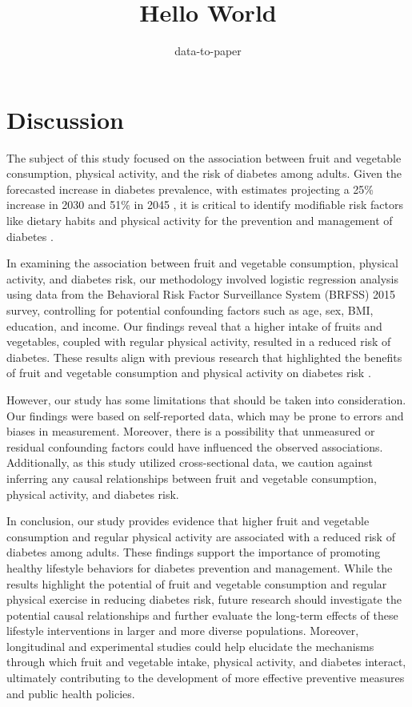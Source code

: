 \documentclass[12pt]{article}
\title{Hello World}
\author{data-to-paper}
\begin{document}
\maketitle

\section{Discussion}

The subject of this study focused on the association between fruit and vegetable consumption, physical activity, and the risk of diabetes among adults. Given the forecasted increase in diabetes prevalence, with estimates projecting a 25\% increase in 2030 and 51\% in 2045 \cite{Saeedi2019GlobalAR}, it is critical to identify modifiable risk factors like dietary habits and physical activity for the prevention and management of diabetes \cite{Uloko2018PrevalenceAR}. 

In examining the association between fruit and vegetable consumption, physical activity, and diabetes risk, our methodology involved logistic regression analysis using data from the Behavioral Risk Factor Surveillance System (BRFSS) 2015 survey, controlling for potential confounding factors such as age, sex, BMI, education, and income. Our findings reveal that a higher intake of fruits and vegetables, coupled with regular physical activity, resulted in a reduced risk of diabetes. These results align with previous research that highlighted the benefits of fruit and vegetable consumption and physical activity on diabetes risk \cite{Herbst2007ImpactOP, Carlstrm2018CoffeeCA, Drouin-Chartier2016SystematicRO}.

However, our study has some limitations that should be taken into consideration. Our findings were based on self-reported data, which may be prone to errors and biases in measurement. Moreover, there is a possibility that unmeasured or residual confounding factors could have influenced the observed associations. Additionally, as this study utilized cross-sectional data, we caution against inferring any causal relationships between fruit and vegetable consumption, physical activity, and diabetes risk. 

In conclusion, our study provides evidence that higher fruit and vegetable consumption and regular physical activity are associated with a reduced risk of diabetes among adults. These findings support the importance of promoting healthy lifestyle behaviors for diabetes prevention and management. While the results highlight the potential of fruit and vegetable consumption and regular physical exercise in reducing diabetes risk, future research should investigate the potential causal relationships and further evaluate the long-term effects of these lifestyle interventions in larger and more diverse populations. Moreover, longitudinal and experimental studies could help elucidate the mechanisms through which fruit and vegetable intake, physical activity, and diabetes interact, ultimately contributing to the development of more effective preventive measures and public health policies.
\end{document}
